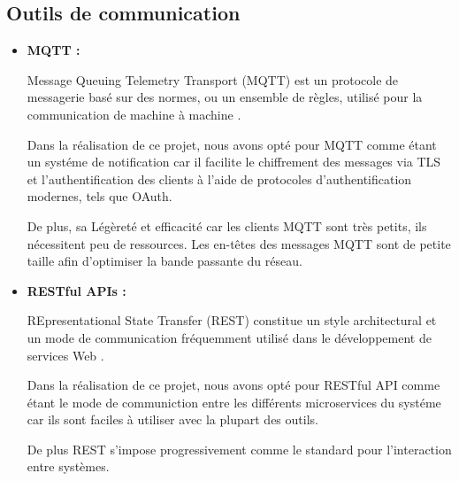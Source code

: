 \subsection{Outils de communication}
\begin{itemize}
    \item\textbf{MQTT : }
                \par Message Queuing Telemetry Transport (MQTT) est un protocole de messagerie basé sur des normes, ou un ensemble de règles, utilisé pour la communication de machine à machine \cite{mqtt}. 
                \par Dans la réalisation de ce projet, nous avons opté pour MQTT comme étant un systéme de notification car il facilite le chiffrement des messages 
                via TLS et l'authentification des clients à l'aide de protocoles d'authentification modernes, tels que OAuth. 
                \par De plus, sa Légèreté et efficacité car les clients MQTT sont très petits, ils nécessitent peu de ressources. 
                Les en-têtes des messages MQTT sont de petite taille afin d'optimiser la bande passante du réseau.

    \item\textbf{RESTful APIs :}
    
            \par REpresentational State Transfer (REST) constitue un style architectural et un mode de communication fréquemment utilisé dans le développement de services Web \cite{rest}. 
            \par Dans la réalisation de ce projet, nous avons opté pour RESTful API comme étant le mode de communiction entre les différents microservices du systéme car ils sont faciles à utiliser avec la plupart des outils. 
            \par De plus REST s'impose progressivement comme le standard pour l'interaction entre systèmes. 

    \end{itemize}
